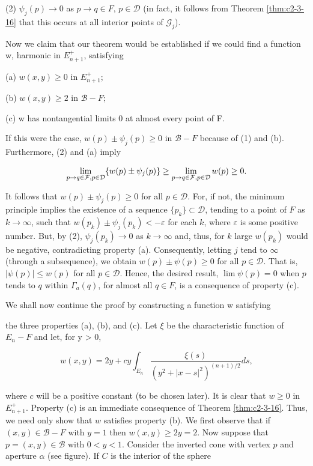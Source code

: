 (2) $\psi_j(p) \to 0$ as $p \to q \in F$, $p \in \mathcal{D}$ (in fact, it follows from Theorem \ref{thm:c2-3-16} that this occurs at all interior points of $\mathcal{G}_j$).

Now we claim that our theorem would be established if we could find a function w, harmonic in $E_{n+1}^{+}$, satisfying

(a) $w(x, y) \geq 0$ in $E_{n+1}^+$;

(b) $w(x, y) \geq 2 \text{ in } \mathcal{B} - F;$

(c) w has nontangential limits 0 at almost every point of F.

If this were the case, $w(p) \pm \psi_j(p) \geq 0$ in $\mathcal{B} - F$ because of (1) and (b). Furthermore, (2) and (a) imply

\[
\lim_{p\to q\in{\cal F},p\in\mathcal{D}}\{w(p)\pm\psi_{j}(p)\}\geq\lim_{p\to q\in{\cal F},p\in\mathcal{D}}w(p)\geq0.
\]

It follows that $w(p) \pm \psi_j(p) \geq 0$ for all $p \in \mathcal{D}$. For, if not, the minimum principle implies the existence of a sequence $\{p_k\} \subset \mathcal{D}$, tending to a point of $F$ as $k \to \infty$, such that $w(p_k) \pm \psi_j(p_k) < -\varepsilon$ for each $k$, where $\varepsilon$ is some positive number. But, by (2), $\psi_j(p_k) \to 0$ as $k \to \infty$ and, thus, for $k$ large $w(p_k)$ would be negative, contradicting property (a). Consequently, letting $j$ tend to $\infty$ (through a subsequence), we obtain $w(p) \pm \psi(p) \geq 0$ for all $p \in \mathcal{D}$. That is, $|\psi(p)| \leq w(p)$ for all $p \in \mathcal{D}$. Hence, the desired result, $\lim \psi(p) = 0$ when $p$ tends to $q$ within $\Gamma_a(q)$, for almost all $q \in F$, is a consequence of property (c).

We shall now continue the proof by constructing a function w satisfying

the three properties (a), (b), and (c). Let $\xi$ be the characteristic function of $E_{n} - F$ and let, for y > 0,

\[
w(x,y)=2y+c y\int_{E_{n}}\frac{\xi(s)}{(y^{2}+|x-s|^{2})^{(n+1)/2}}d s,
\]

where $c$ will be a positive constant (to be chosen later). It is clear that $w \geq 0$ in $E_{n+1}^{+}$. Property (c) is an immediate consequence of Theorem \ref{thm:c2-3-16}. Thus, we need only show that $w$ satisfies property (b). We first observe that if $(x, y) \in \mathcal{B} - F$ with $y = 1$ then $w(x, y) \geq 2y = 2$. Now suppose that $p = (x, y) \in \mathcal{B}$ with $0 < y < 1$. Consider the inverted cone with vertex $p$ and aperture $\alpha$ (see figure). If $C$ is the interior of the sphere

